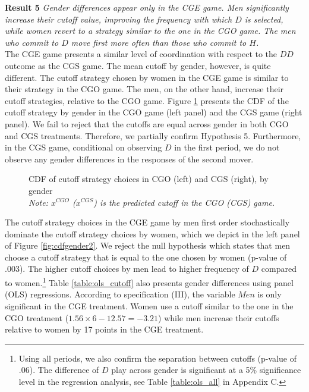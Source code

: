 \documentclass[12pt, letterpaper]{article}
\theoremstyle{plain}
\begin{document}
\noindent \textbf{Result 5}
\textit{Gender differences appear only in the CGE game. Men significantly increase their cutoff value, improving the frequency with which $D$ is selected, while women revert to a strategy similar to the one in the CGO game. The men who commit to $D$ move first more often than those who commit to $H$.}\\

The CGE game presents a similar level of coordination with respect to the $DD$ outcome as the CGS game. The mean cutoff by gender, however, is quite different. The cutoff strategy chosen by women in the CGE game is similar to their strategy in the CGO game. The men, on the other hand, increase their cutoff strategies, relative to the CGO game. Figure \ref{fig:cdfgender1} presents the CDF of the cutoff strategy by gender in the CGO game (left panel) and the CGS  game (right panel). We fail to reject that the cutoffs are equal across gender in both CGO and CGS treatments. Therefore, we partially confirm Hypothesis 5. Furthermore, in the CGS game, conditional on observing $D$ in the first period, we do not observe any gender differences in the responses of the second mover. 
\begin{center}
\begin{figure}[ht]
\centering{}%
\begin{minipage}[t]{0.45\columnwidth}%
%
\end{minipage}%
\begin{minipage}[t]{0.45\columnwidth}%
%
\end{minipage} 
\caption{CDF of cutoff strategy choices in CGO (left) and CGS (right), by gender \\\footnotesize{\textit{Note: $x^{CGO}$ ($x^{CGS}$) is the predicted cutoff in the CGO (CGS) game.}} }
\label{fig:cdfgender1}\end{figure}
\par\end{center}


The cutoff strategy choices in the CGE game by men first order stochastically dominate the cutoff strategy choices by women, which we depict in the left panel of Figure \ref{fig:cdfgender2}. We reject the null hypothesis which states that men choose a cutoff strategy that is equal to the one chosen by women (p-value of .003). The higher cutoff choices by men lead to higher frequency of $D$ compared to women.\footnote{Using all periods, we also confirm the separation between cutoffs (p-value of .06). The difference of $D$ play across gender is significant at a 5\% significance level in the regression analysis, see Table \ref{table:ols_all} in Appendix C.} Table \ref{table:ols_cutoff} also presents gender differences using panel (OLS) regressions. According to specification (III), the variable $Men$ is only significant in the CGE treatment. Women use a cutoff similar to the one in the CGO treatment ($1.56\times 6-12.57= -3.21$) while men increase their cutoffs relative to women by 17 points in the CGE treatment. 
\end{document}
